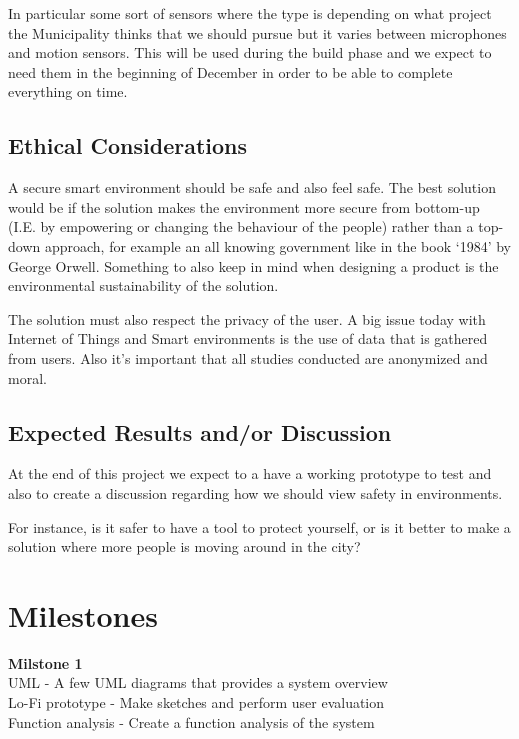 \documentclass[twoside]{report}
\begin{document}
In particular some sort of sensors where the type is depending on what project
the Municipality thinks that we should pursue but it varies between microphones
and motion sensors. This will be used during the build phase and we expect to
need them in the beginning of December in order to be able to complete
everything on time. 


\subsection{Ethical Considerations}


A secure smart environment should be safe and also feel safe. The best solution
would be if the solution makes the environment more secure from bottom-up (I.E.
by empowering or changing the behaviour of the people) rather than a top-down
approach, for example an all knowing government like in the book ‘1984’ by
George Orwell. Something to also keep in mind when designing a product is the
environmental sustainability of the solution. 

The solution must also respect the privacy of the user. A big issue today with
Internet of Things and Smart environments is the use of data that is gathered
from users. Also it’s important that all studies conducted are anonymized and
moral. 

\subsection{Expected Results and/or Discussion}


At the end of this project we expect to a have a working prototype to test and
also to create a discussion regarding how we should view safety in environments.

For instance, is it safer to have a tool to protect yourself, or is it better to
make a solution where more people is moving around in the city?

\section{Milestones}

\textbf{Milstone 1}\\
UML - A few UML diagrams that provides a system overview\\
Lo-Fi prototype - Make sketches and perform user evaluation\\
Function analysis - Create a function analysis of the system\\
\end{document}
